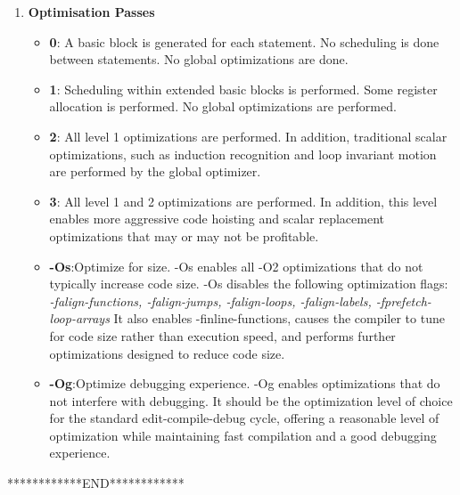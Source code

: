 \documentclass[english,a4paper,12pt]{article}
\begin{document}
\begin{enumerate}
\item {\textbf{Optimisation Passes}}
\\
\begin{itemize}
 \textbf{-O[level]} Sets the optimization level. If -O is not specified, then the default level is 1 if -g is not specified, and 0 if -g is specified. If a number is not specified with -O, then the optimization level is set to 2. The optimization levels are:
\item \textbf{0}: A basic block is generated for each statement. No scheduling is done between statements. No global optimizations are done.
\item \textbf{1}: Scheduling within extended basic blocks is performed. Some register allocation is performed. No global optimizations are performed.
\item \textbf{2}: All level 1 optimizations are performed. In addition, traditional scalar optimizations, such as induction recognition and loop invariant motion are performed by the global optimizer.
\item \textbf{3}: All level 1 and 2 optimizations are performed. In addition, this level enables more aggressive code hoisting and scalar replacement optimizations that may or may not be profitable.
\end{itemize}
 
 \begin{itemize}
     \item \textbf{-Os}:Optimize for size.  -Os enables all -O2 optimizations that do not typically increase code size. -Os disables the following optimization flags: \\
     \textit{ -falign-functions, -falign-jumps,  -falign-loops, -falign-labels,  -fprefetch-loop-arrays }
It also enables -finline-functions, causes the compiler to tune for code size rather than execution speed, and performs further optimizations designed to reduce code size.
 \item \textbf{-Og}:Optimize debugging experience.  -Og enables optimizations that do not interfere with debugging. It should be the optimization level of choice for the standard edit-compile-debug cycle, offering a reasonable level of optimization while maintaining fast compilation and a good debugging experience.
 \end{itemize}
\end{enumerate}

\vspace{5cm}

************END************
\newpage    
\end{document}
